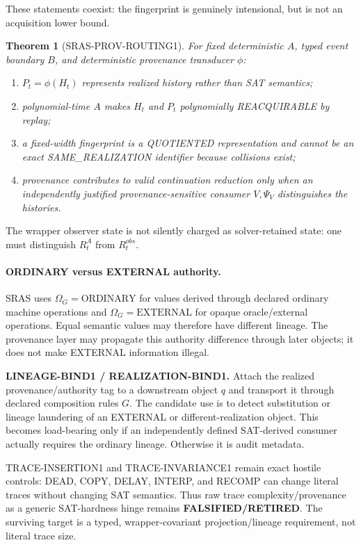 \documentclass[11pt]{article}
\newcommand{\statusretired}{\textcolor{retired}{\textbf{FALSIFIED/RETIRED}}}
\theoremstyle{plain}
\newtheorem{theorem}{Theorem}[section]
\theoremstyle{definition}
\theoremstyle{remark}
\begin{document}
These statements coexist: the fingerprint is genuinely intensional, but is
not an acquisition lower bound.

\begin{theorem}[SRAS-PROV-ROUTING1]
For fixed deterministic \(A\), typed event boundary \(B\), and deterministic
provenance transducer \(\phi\):
\begin{enumerate}[leftmargin=1.5em]
\item \(P_t=\phi(H_t)\) represents realized history rather than SAT semantics;
\item polynomial-time \(A\) makes \(H_t\) and \(P_t\) polynomially
REACQUIRABLE by replay;
\item a fixed-width fingerprint is a QUOTIENTED representation and cannot be
an exact SAME\_REALIZATION identifier because collisions exist;
\item provenance contributes to valid continuation reduction only when an
independently justified provenance-sensitive consumer \(V,\Psi_V\)
distinguishes the histories.
\end{enumerate}
\end{theorem}

The wrapper observer state is not silently charged as solver-retained state:
one must distinguish \(R_t^A\) from \(R_t^{obs}\).

\paragraph{ORDINARY versus EXTERNAL authority.}
SRAS uses \(\Omega_G=\mathrm{ORDINARY}\) for values derived through declared
ordinary machine operations and \(\Omega_G=\mathrm{EXTERNAL}\) for opaque
oracle/external operations. Equal semantic values may therefore have different
lineage. The provenance layer may propagate this authority difference through
later objects; it does not make EXTERNAL information illegal.

\begin{candidatebox}
\textbf{LINEAGE-BIND1 / REALIZATION-BIND1.}
Attach the realized provenance/authority tag to a downstream object \(q\) and
transport it through declared composition rules \(G\). The candidate use is
to detect substitution or lineage laundering of an EXTERNAL or
different-realization object. This becomes load-bearing only if an
independently defined SAT-derived consumer actually requires the ordinary
lineage. Otherwise it is audit metadata.
\end{candidatebox}

TRACE-INSERTION1 and TRACE-INVARIANCE1 remain exact hostile controls: DEAD,
COPY, DELAY, INTERP, and RECOMP can change literal traces without changing SAT
semantics. Thus raw trace complexity/provenance as a generic SAT-hardness hinge
remains \statusretired. The surviving target is a typed, wrapper-covariant
projection/lineage requirement, not literal trace size.
\end{document}
